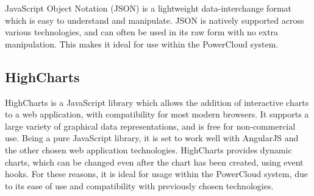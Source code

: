 \documentclass{article}
\begin{document}
	JavaScript Object Notation (JSON) is a lightweight data-interchange 
	format which is easy to understand and manipulate. JSON is natively 
	supported across various technologies, and can often be used in its 
	raw form with no extra manipulation. This makes it ideal for use 
	within the PowerCloud system.
	
	\subsection{HighCharts}
	
	HighCharts is a JavaScript library which allows the addition of 
	interactive charts to a web application, with compatibility for most 
	modern browsers. It supports a large variety of graphical data 
	representations, and is free for non-commercial use. Being a pure 
	JavaScript library, it is set to work well with AngularJS and the 
	other chosen web application technologies. HighCharts provides 
	dynamic charts, which can be changed even after the chart has been 
	created, using event hooks. For these reasons, it is ideal for usage 
	within the PowerCloud system, due to its ease of use and 
	compatibility with previously chosen technologies. 
\end{document}
